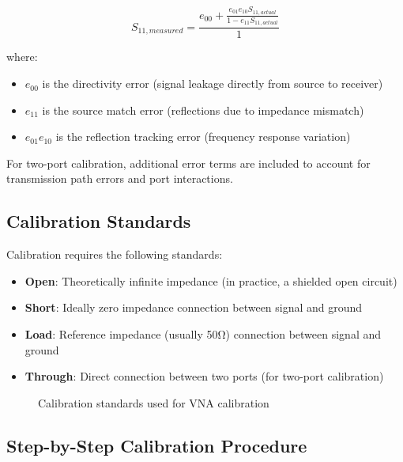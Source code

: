 \documentclass[12pt,a4paper]{article}
\begin{document}
\begin{equation}
    S_{11,measured} = \frac{e_{00} + \frac{e_{01}e_{10}S_{11,actual}}{1-e_{11}S_{11,actual}}}{1}
\end{equation}

where:
\begin{itemize}
    \item $e_{00}$ is the directivity error (signal leakage directly from source to receiver)
    \item $e_{11}$ is the source match error (reflections due to impedance mismatch)
    \item $e_{01}e_{10}$ is the reflection tracking error (frequency response variation)
\end{itemize}

For two-port calibration, additional error terms are included to account for transmission path errors and port interactions.

\subsection{Calibration Standards}

Calibration requires the following standards:

\begin{itemize}
    \item \textbf{Open}: Theoretically infinite impedance (in practice, a shielded open circuit)
    \item \textbf{Short}: Ideally zero impedance connection between signal and ground
    \item \textbf{Load}: Reference impedance (usually 50Ω) connection between signal and ground
    \item \textbf{Through}: Direct connection between two ports (for two-port calibration)
\end{itemize}

\begin{figure}[H]
    \centering
    \caption{Calibration standards used for VNA calibration}
    \label{fig:cal_standards}
\end{figure}

\subsection{Step-by-Step Calibration Procedure}
\end{document}
